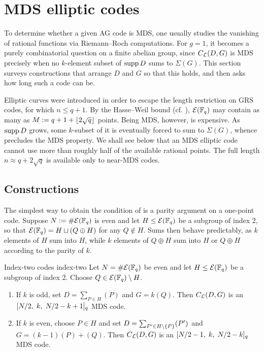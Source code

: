 \documentclass[twocolumn, 11pt]{scrartcl}
\begin{document}
\section{MDS elliptic codes} \label{section:mds-ecc}

To determine whether a given AG code is MDS, one usually studies the vanishing of rational functions via Riemann--Roch computations. For $g=1$, it becomes a purely combinatorial question on a finite abelian group, since $C_\mathcal{L}(D,G)$ is MDS precisely when no $k$-element subset of $\operatorname{supp} D$ sums to $\Sigma(G)$. This section surveys constructions that arrange $D$ and $G$ so that this holds, and then asks how long such a code can be.

Elliptic curves were introduced in order to escape the length restriction on GRS codes, for which $n\leq q+1$. By the Hasse--Weil bound (cf. ), $\mathcal{E}(\mathbb{F}_q)$ may contain as many as $M:=q+1+\lfloor2\sqrt q\rfloor$ points. Being MDS, however, is expensive. As $\operatorname{supp} D$ grows, some $k$-subset of it is eventually forced to sum to $\Sigma(G)$, whence  precludes the MDS property. We shall see below that an MDS elliptic code cannot use more than roughly half of the available rational points. The full length $n\approx q+2\sqrt q$ is available only to near-MDS codes.

\subsection{Constructions}

The simplest way to obtain the condition of  is a parity argument on a one-point code. Suppose $N:=\#\mathcal{E}(\mathbb{F}_q)$ is even and let $H\leq\mathcal{E}(\mathbb{F}_q)$ be a subgroup of index 2, so that $\mathcal{E}(\mathbb{F}_q)=H\sqcup(Q\oplus H)$ for any $Q\notin H$. Sums then behave predictably, as $k$ elements of $H$ sum into $H$, while $k$ elements of $Q\oplus H$ sum into $H$ or $Q\oplus H$ according to the parity of $k$.

\begin{construction}{Index-two codes \cite{wang2025nonrs}}{index-two}
    Let $N=\#\mathcal{E}(\mathbb{F}_q)$ be even and let $H\leq\mathcal{E}(\mathbb{F}_q)$ be a subgroup of index 2. Choose $Q\in\mathcal{E}(\mathbb{F}_q)\setminus H$.
    \begin{enumerate}
        \item \label{enum:index-two-odd} If $k$ is odd, set $D=\sum_{P\in H}(P)$ and $G=k(Q)$. Then $C_\mathcal{L}(D,G)$ is an $[N/2,\;k,\;N/2-k+1]_q$ MDS code.
        \item \label{enum:index-two-even} If $k$ is even, choose $P\in H$ and set $D=\sum_{P'\in H\setminus\{P\}}(P')$ and $G=(k-1)(P)+(Q)$. Then $C_\mathcal{L}(D,G)$ is an $[N/2-1,\;k,\;N/2-k]_q$ MDS code.
    \end{enumerate}
\end{construction}
\end{document}
